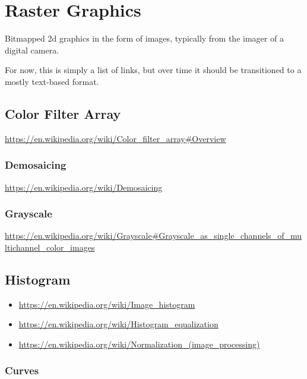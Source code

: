 \section{Raster Graphics}

Bitmapped 2d graphics in the form of images, typically from the imager of a digital camera.

For now, this is simply a list of links, but over time it should be transitioned to a mostly text-based format.

\subsection{Color Filter Array}

\url{https://en.wikipedia.org/wiki/Color_filter_array#Overview}

\subsubsection{Demosaicing}

\url{https://en.wikipedia.org/wiki/Demosaicing}

\subsubsection{Grayscale}

\url{https://en.wikipedia.org/wiki/Grayscale#Grayscale_as_single_channels_of_multichannel_color_images}

\subsection{Histogram}

\begin{itemize}
  \item \url{https://en.wikipedia.org/wiki/Image_histogram}
  \item {}\url{https://en.wikipedia.org/wiki/Histogram_equalization}
  \item {}\url{https://en.wikipedia.org/wiki/Normalization_(image_processing)}
\end{itemize}

\subsubsection{Curves}

